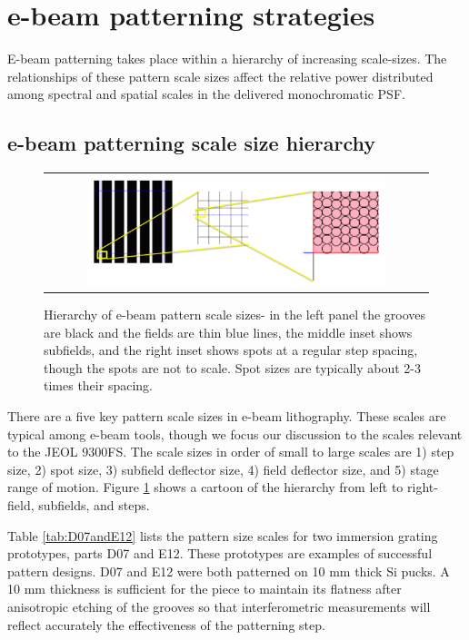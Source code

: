 \section{e-beam patterning strategies}
E-beam patterning takes place within a hierarchy of increasing scale-sizes.  The relationships of these pattern scale sizes affect the relative power distributed among spectral and spatial scales in the delivered monochromatic PSF.

\subsection{e-beam patterning scale size hierarchy}

\begin{figure}
\begin{center}
 \begin{tabular}{c}
    \includegraphics[width=0.8\textwidth]{chSPIE_2014_ebeam/figs/Field_sizes_cascade_02.png}
   \end{tabular}
  \end{center}
  \caption[e-beam Hierarchy]{\label{fig:Hierarchy} Hierarchy of e-beam pattern scale sizes- in the left panel the grooves are black and the fields are thin blue lines, the middle inset shows subfields, and the right inset shows spots at a regular step spacing, though the spots are not to scale.  Spot sizes are typically about 2-3 times their spacing.}
\end{figure}


There are a five key pattern scale sizes in e-beam lithography.  These scales are typical among e-beam tools, though we focus our discussion to the scales relevant to the JEOL 9300FS.  The scale sizes in order of small to large scales are 1) step size, 2) spot size, 3) subfield deflector size, 4) field deflector size, and 5) stage range of motion.  Figure \ref{fig:Hierarchy} shows a cartoon of the hierarchy from left to right- field, subfields, and steps.

Table \ref{tab:D07andE12} lists the pattern size scales for two immersion grating prototypes, parts D07 and E12.  These prototypes are examples of successful pattern designs.  D07 and E12 were both patterned on 10 mm thick Si pucks.  A 10 mm thickness is sufficient for the piece to maintain its flatness after anisotropic etching of the grooves so that interferometric measurements will reflect accurately the effectiveness of the patterning step.

